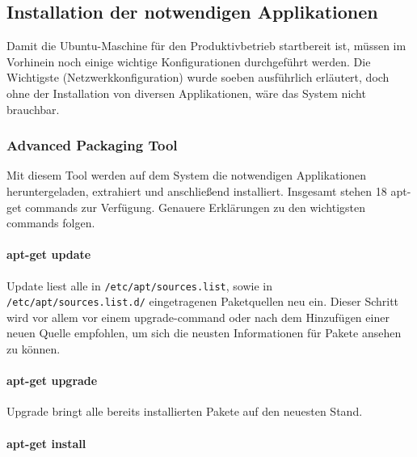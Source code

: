 \documentclass[
]{article}
\begin{document}
\hypertarget{installation-der-notwendigen-applikationen}{%
\subsection{Installation der notwendigen
Applikationen}\label{installation-der-notwendigen-applikationen}}

Damit die Ubuntu-Maschine für den Produktivbetrieb startbereit ist,
müssen im Vorhinein noch einige wichtige Konfigurationen durchgeführt
werden. Die Wichtigste (Netzwerkkonfiguration) wurde soeben ausführlich
erläutert, doch ohne der Installation von diversen Applikationen, wäre
das System nicht brauchbar.

\hypertarget{advanced-packaging-tool}{%
\subsubsection{Advanced Packaging Tool}\label{advanced-packaging-tool}}

Mit diesem Tool werden auf dem System die notwendigen Applikationen
heruntergeladen, extrahiert und anschließend installiert. Insgesamt
stehen 18 apt-get commands zur Verfügung. Genauere Erklärungen zu den
wichtigsten commands folgen.

\hypertarget{apt-get-update}{%
\paragraph{apt-get update}\label{apt-get-update}}

Update liest alle in \texttt{/etc/apt/sources.list}, sowie in
\texttt{/etc/apt/sources.list.d/} eingetragenen Paketquellen neu ein.
Dieser Schritt wird vor allem vor einem upgrade-command oder nach dem
Hinzufügen einer neuen Quelle empfohlen, um sich die neusten
Informationen für Pakete ansehen zu können.

\hypertarget{apt-get-upgrade}{%
\paragraph{apt-get upgrade}\label{apt-get-upgrade}}

Upgrade bringt alle bereits installierten Pakete auf den neuesten Stand.

\hypertarget{apt-get-install}{%
\paragraph{apt-get install}\label{apt-get-install}}
\end{document}
